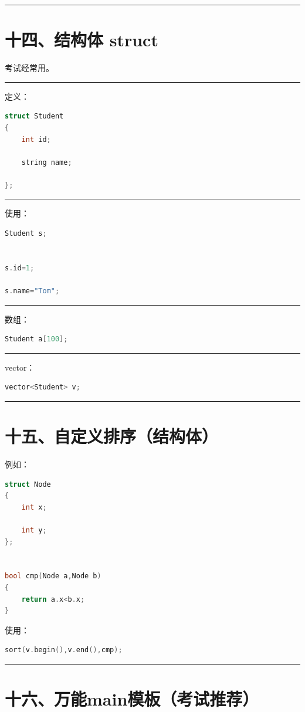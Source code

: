 \documentclass[9pt,twocolumn]{extarticle}
\begin{document}
\noindent\rule{\linewidth}{0.4pt}

\section{十四、结构体 struct}

考试经常用。

\noindent\rule{\linewidth}{0.4pt}

定义：
\begin{lstlisting}[language=C++]
struct Student
{
    int id;

    string name;

};
\end{lstlisting}

\noindent\rule{\linewidth}{0.4pt}

使用：
\begin{lstlisting}[language=C++]
Student s;


s.id=1;

s.name="Tom";
\end{lstlisting}

\noindent\rule{\linewidth}{0.4pt}

数组：
\begin{lstlisting}[language=C++]
Student a[100];
\end{lstlisting}

\noindent\rule{\linewidth}{0.4pt}

vector：
\begin{lstlisting}[language=C++]
vector<Student> v;
\end{lstlisting}

\noindent\rule{\linewidth}{0.4pt}

\section{十五、自定义排序（结构体）}

例如：
\begin{lstlisting}[language=C++]
struct Node
{
    int x;

    int y;
};


bool cmp(Node a,Node b)
{
    return a.x<b.x;
}
\end{lstlisting}
使用：
\begin{lstlisting}[language=C++]
sort(v.begin(),v.end(),cmp);
\end{lstlisting}

\noindent\rule{\linewidth}{0.4pt}

\section{十六、万能main模板（考试推荐）}
\end{document}
